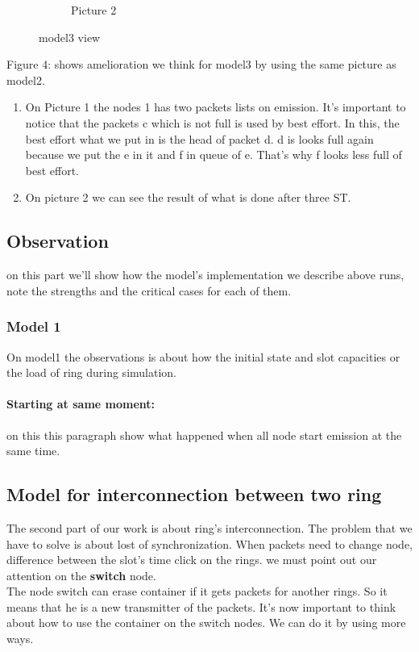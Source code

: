 \documentclass{article}
\begin{document}
\begin{figure}
\begin{subfigure}[b]{0.3\textwidth}
    \caption{Picture 2}
    \label{fig:2}
  \end{subfigure}
\caption{ model3 view}
\end{figure}


Figure 4: shows amelioration  we think for model3 by using the same picture as model2.
\begin{enumerate}[label=$\bullet$]
\item On Picture 1 the nodes 1 has two packets lists on emission. It's important to notice that the packets c which is not full is used by best effort. In this, the best effort what we put in is the head of packet d. d is looks full again because we put the e in it and f in queue of e. That's why f looks less full of best effort. 
\item On picture 2 we can see the result of what is done after three ST. 
\end{enumerate}
\clearpage

\subsection{Observation}
	on this part  we'll  show how the model's  implementation we describe above runs, note the strengths and the critical cases for each of them.
\subsubsection {Model 1}
On model1 the observations is about how the initial state and slot capacities or the load of ring during simulation.
\paragraph{Starting at same moment:} 
on this this paragraph show what happened when all node start emission at the same time.


\subsection{Model for  interconnection between two ring}
The second part of our work is about ring's interconnection. The problem that we have to solve is about lost of synchronization. When packets need to change node, difference between the slot's time click on the rings. we must point out our attention on the   \textbf{switch} node.\\
The node switch can erase container if it gets packets for another rings. So it means that he is a new 
transmitter of the packets. It's now important to think about how to use the container on the switch nodes. We can do it by using more ways.\\
\end{document}
